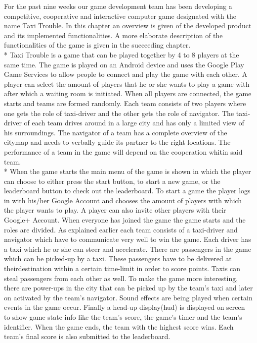 For the past nine weeks our game development team has been developing a competitive, cooperative and interactive computer game designated with the name Taxi Trouble. In this chapter an overview is given of the developed product and its implemented functionalities. A more elaborate description of the functionalities of the game is given in the succeeding chapter.
\\*
Taxi Trouble is a game that can be played together by 4 to 8 players at the same time. The game is played on an Android device and uses the Google Play Game Services to allow people to connect and play the game with each other. A player can select the amount of players that he or she wants to play a game with after which a waiting room is initiated. When all players are connected, the game starts and teams are formed randomly. Each team consists of two players where one gets the role of taxi-driver and the other gets the role of navigator. The taxi-driver of each team drives around in a large city and has only a limited view of his surroundings. The navigator of a team has a complete overview of the citymap and needs to verbally guide its partner to the right locations. The performance of a team in the game will depend on the cooperation whitin said team.
\\*
When the game starts the main menu of the game is shown in which the player can choose to either press the start button, to start a new game, or the leaderboard button to check out the leaderboard.
To start a game the player logs in with his/her Google Account and chooses the amount of players with which the player wants to play. A player can also invite other players with their Google+ Account. When everyone has joined the game the game starts and the roles are divided.
As explained earlier each team consists of a taxi-driver and navigator which have to communicate very well to win the game. Each driver has a taxi which he or she can steer and accelerate. There are passengers in the game which can be picked-up by a taxi. These passengers have to be delivered at theirdestination within a certain time-limit in order to score points. Taxis can steal passengers from each other as well. To make the game more interesting, there are power-ups in the city that can be picked up by the team's taxi and later on activated by the team's navigator. Sound effects are being played when certain events in the game occur. Finally a head-up display(hud) is displayed on screen to show game state info like the team's score, the game's timer and the team's identifier. When the game ends, the team with the highest score wins. Each team's final score is also submitted to the leaderboard.